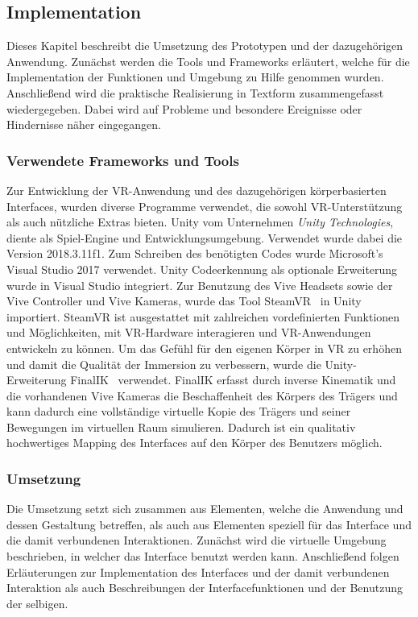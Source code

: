 \subsection{Implementation}
Dieses Kapitel beschreibt die Umsetzung des Prototypen und der dazugehörigen Anwendung. Zunächst werden die Tools und Frameworks erläutert, welche für die Implementation der Funktionen und Umgebung zu Hilfe genommen wurden. Anschließend wird die praktische Realisierung in Textform zusammengefasst wiedergegeben. Dabei wird auf Probleme und besondere Ereignisse oder Hindernisse näher eingegangen.

\subsubsection{Verwendete Frameworks und Tools}
Zur Entwicklung der VR-Anwendung und des dazugehörigen körperbasierten Interfaces, wurden diverse Programme verwendet, die sowohl VR-Unterstützung als auch nützliche Extras bieten. Unity vom Unternehmen \textit{Unity Technologies}, diente als Spiel-Engine und Entwicklungsumgebung. Verwendet wurde dabei die Version 2018.3.11f1. Zum Schreiben des benötigten Codes wurde Microsoft's Visual Studio 2017 verwendet. Unity Codeerkennung als optionale Erweiterung wurde in Visual Studio integriert. Zur Benutzung des Vive Headsets sowie der Vive Controller und Vive Kameras, wurde das Tool SteamVR~\citep{steamvr} in Unity importiert. SteamVR ist ausgestattet mit zahlreichen vordefinierten Funktionen und Möglichkeiten, mit VR-Hardware interagieren und VR-Anwendungen entwickeln zu können. Um das Gefühl für den eigenen Körper in VR zu erhöhen und damit die Qualität der Immersion zu verbessern, wurde die Unity-Erweiterung FinalIK~\citep{finalik} verwendet. FinalIK erfasst durch inverse Kinematik und die vorhandenen Vive Kameras die Beschaffenheit des Körpers des Trägers und kann dadurch eine vollständige virtuelle Kopie des Trägers und seiner Bewegungen im virtuellen Raum simulieren. Dadurch ist ein qualitativ hochwertiges Mapping des Interfaces auf den Körper des Benutzers möglich.

\subsubsection{Umsetzung}
Die Umsetzung setzt sich zusammen aus Elementen, welche die Anwendung und dessen Gestaltung betreffen, als auch aus Elementen speziell für das Interface und die damit verbundenen Interaktionen. Zunächst wird die virtuelle Umgebung beschrieben, in welcher das Interface benutzt werden kann. Anschließend folgen Erläuterungen zur Implementation des Interfaces und der damit verbundenen Interaktion als auch Beschreibungen der Interfacefunktionen und der Benutzung der selbigen.\\

